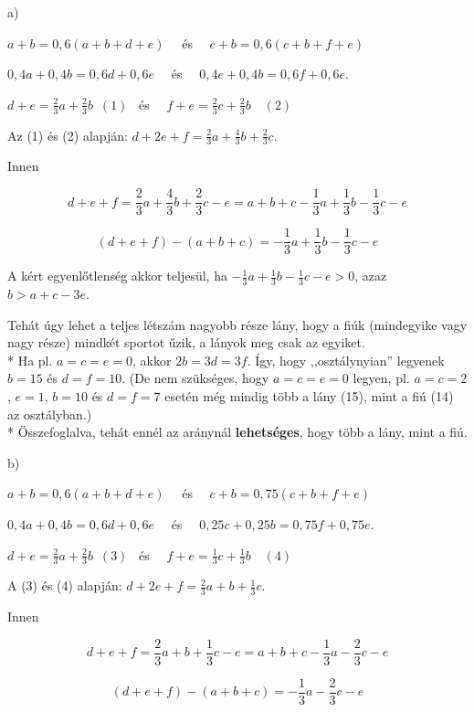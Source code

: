 \documentclass[a4paper,10pt]{article}
\begin{document}
a)
   
        $a+b=0,6(a+b+d+e)\enspace\enspace$ és $\enspace\enspace c+b=0,6(c+b+f+e)$
        
        $0,4a+0,4b=0,6d+0,6e\enspace\enspace$ és $\enspace\enspace0,4e+0,4b=0,6f+0,6e$.
        
        $d+e=\frac{2}{3} a+\frac{2}{3} b \enspace (1) \enspace $ és $ \enspace \enspace f+e=\frac{2}{3} c + \frac{2}{3} b \enspace \enspace (2)$
        
        Az (1) és (2) alapján: $d+2e+f=\frac{2}{3} a +\frac{4}{3} b+\frac{2}{3} c$.
        
        Innen
        
        $$d+e+f=\frac23 a+\frac43 b+\frac23 c-e=a+b+c-\frac13 a+\frac13 b-\frac13 c-e$$
        
$$(d+e+f)-(a+b+c)=-\frac13 a+\frac13 b - \frac13 c-e$$
        
        A kért egyenlőtlenség akkor teljesül, ha $-\frac13 a+\frac13 b - \frac13 c-e >0$, azaz $b>a+c-3e$.
        
        Tehát úgy lehet a teljes létszám nagyobb része lány, hogy a fiúk (mindegyike vagy nagy része) mindkét sportot űzik, a lányok meg csak az egyiket. \\*
        Ha pl. $a=c=e=0$, akkor $2b=3d=3f$. Így, hogy ,,osztálynyian'' legyenek $b=15$ és $d=f=10$. (De nem szükséges, hogy $a=c=e=0$ legyen, pl. $a=c=2$, $e=1$, $b=10$ és $d=f=7$ esetén még mindig több a lány (15), mint a fiú (14) az osztályban.) \\*
        Összefoglalva, tehát ennél az aránynál {\bf lehetséges}, hogy több a lány, mint a fiú.
  
\medskip        
b)

$a+b=0,6(a+b+d+e)\enspace\enspace$ és $\enspace\enspace c+b=0,75(c+b+f+e)$
        
        $0,4a+0,4b=0,6d+0,6e\enspace\enspace$ és $\enspace\enspace 0,25c+0,25b=0,75f+0,75e$.
        
        $d+e=\frac{2}{3} a+\frac{2}{3} b \enspace (3) \enspace $ és $ \enspace \enspace f+e=\frac{1}{3} c + \frac{1}{3} b \enspace \enspace (4)$
        
        A (3) és (4) alapján: $d+2e+f=\frac{2}{3} a + b+\frac{1}{3} c$.
        
        Innen
        
        $$d+e+f=\frac23 a+ b+\frac 13 c-e=a+b+c-\frac13 a-\frac 23 c-e$$
        
$$(d+e+f)-(a+b+c)=-\frac13 a - \frac 23 c-e$$
        
\end{document}
